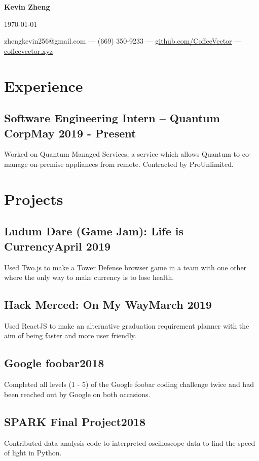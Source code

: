 \documentclass[letterpaper,12pt]{article}
\makeatletter
\newcommand\textbox[1]{%
    \parbox{.333\textwidth}{#1}%
}
\renewcommand{\maketitle}{
    \begin{center}
        \noindent\textbox{\hfill}\textbox{\hfil\bfseries\huge Kevin Zheng\hfil}\textbox{\hfill \today}
        {\faEnvelope \enskip zhengkevin256@gmail.com --- \faPhone \enskip (669) 350-9233 --- \faGithub \enskip \underline{\color{blue}\href{https://github.com/CoffeeVector}{github.com/CoffeeVector}} --- \faChain \enskip \underline{\color{blue}\href{https://coffeevector.xyz}{coffeevector.xyz}}}
    \end{center} }
\makeatother
\begin{document}
\maketitle
\section{Experience}
    \subsection{Software Engineering Intern -- Quantum Corp\null\hfill May 2019 - Present}
    Worked on Quantum Managed Services, a service which allows Quantum to co-manage on-premise appliances from remote.
 Contracted by ProUnlimited.
    \vspace*{-2mm}
\section{Projects}
    \subsection{Ludum Dare (Game Jam): Life is Currency\null\hfill April 2019}
    Used Two.js to make a Tower Defense browser game in a team with one other where the only way to make currency is to lose health.
    \vspace*{-2mm}
    \subsection{Hack Merced: On My Way\null\hfill March 2019}
    Used ReactJS to make an alternative graduation requirement planner with the aim of being faster and more user friendly.
    \vspace*{-2mm}
    \subsection{Google foobar\null\hfill 2018}
    Completed all levels (1 - 5) of the Google foobar coding challenge twice and had been reached out by Google on both occasions.
    \vspace*{-2mm}
    \subsection{SPARK Final Project\null\hfill 2018}
    Contributed data analysis code to interpreted oscilloscope data to find the speed of light in Python.
    \vspace*{-2mm}
\end{document}
